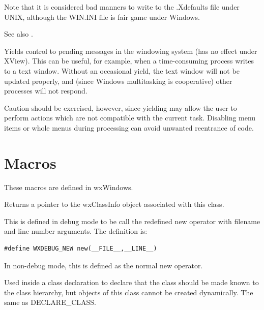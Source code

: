 Note that it is considered bad manners to write to the .Xdefaults
file under UNIX, although the WIN.INI file is fair game under Windows.

See also .



Yields control to pending messages in the windowing system (has no
effect under XView). This can be useful, for example, when a
time-consuming process writes to a text window. Without an occasional
yield, the text window will not be updated properly, and (since Windows
multitasking is cooperative) other processes will not respond.

Caution should be exercised, however, since yielding may allow the
user to perform actions which are not compatible with the current task.
Disabling menu items or whole menus during processing can avoid unwanted
reentrance of code.

\section{Macros}\label{macros}

These macros are defined in wxWindows.

\label{classinfo}


Returns a pointer to the wxClassInfo object associated with this class.

\label{debugnew}


This is defined in debug mode to be call the redefined new operator
with filename and line number arguments. The definition is:

\begin{verbatim}
#define WXDEBUG_NEW new(__FILE__,__LINE__)
\end{verbatim}

In non-debug mode, this is defined as the normal new operator.



Used inside a class declaration to declare that the class should be
made known to the class hierarchy, but objects of this class cannot be created
dynamically. The same as DECLARE\_CLASS.

